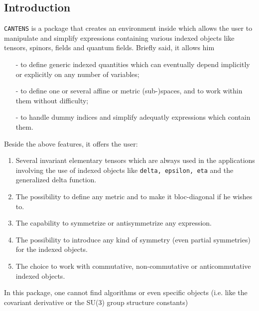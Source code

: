 

\subsection{Introduction}
\texttt{CANTENS} is a package that creates an environment
inside {\REDUCE}
which  allows the user to 
manipulate and simplify expressions containing various indexed objects 
like tensors, spinors, fields and quantum fields.  
Briefly said, it allows him 
\begin{itemize}
\item[-] to define generic indexed quantities which can eventually depend 
implicitly or explicitly on any number of variables;
\item[-] to define one or several affine or metric (sub-)spaces, and to work
within them without difficulty;
\item[-] to handle dummy indices and simplify adequatly expressions
which contain them.
\end{itemize}
Beside the above features, it offers the user:
\begin{enumerate}
\item  Several invariant 
elementary tensors  which are always used in the applications involving 
the use of indexed objects like \texttt{delta, epsilon, eta} and the 
generalized delta function.   
\item The possibility to define any metric and to make it bloc-diagonal 
if he wishes to.
\item The capability to symmetrize or antisymmetrize any expression.
\item The possibility to introduce any kind of symmetry (even partial symmetries)
for the indexed objects.
\item The choice to work with commutative, non-commutative or anticommutative
indexed objects. 
\end{enumerate}
In this package, one cannot find  algorithms or even specific objects 
(i.e. like the covariant derivative or the SU(3) group structure constants) 
